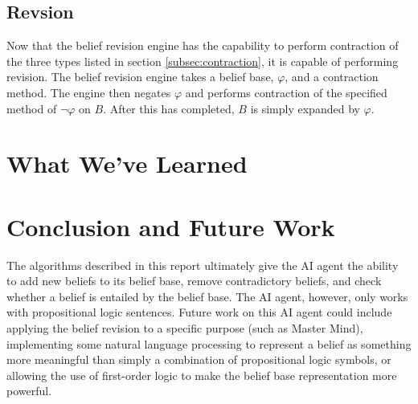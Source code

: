 \documentclass[a4paper,10pt]{article}
\begin{document}
\subsection{Revsion}
\label{subsec:revision}
Now that the belief revision engine has the capability to perform contraction of the three types listed in section \ref{subsec:contraction}, it is capable of performing revision. The belief revision engine takes a belief base, $\varphi$, and a contraction method. The engine then negates $\varphi$ and performs contraction of the specified method of $\neg\varphi$ on $B$. After this has completed, $B$ is simply expanded by $\varphi$.



\section{What We've Learned}
\label{sec:learned}


\section{Conclusion and Future Work}
\label{sec:conclusion}
The algorithms described in this report ultimately give the AI agent the ability to add new beliefs to its belief base, remove contradictory beliefs, and check whether
a belief is entailed by the belief base. The AI agent, however, only works with propositional logic sentences. Future work on this AI agent could include applying the
belief revision to a specific purpose (such as Master Mind), implementing some natural language processing to represent a belief as something more meaningful than simply
a combination of propositional logic symbols, or allowing the use of first-order logic to make the belief base representation more powerful. 


\end{document}
